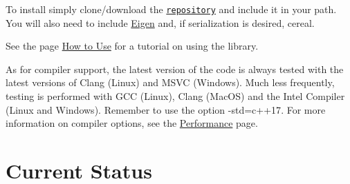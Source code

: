 \begin{DoxyItemize}
\item To install simply clone/download the \href{https://github.com/NickG-Math/Mackey}{\tt repository} and include it in your path. You will also need to include \hyperlink{namespaceEigen}{Eigen} and, if serialization is desired, cereal.
\item See the page \hyperlink{use}{How to Use} for a tutorial on using the library.
\item As for compiler support, the latest version of the code is always tested with the latest versions of Clang (Linux) and M\+S\+VC (Windows). Much less frequently, testing is performed with G\+CC (Linux), Clang (Mac\+OS) and the Intel Compiler (Linux and Windows). Remember to use the option {\ttfamily -\/std=c++17}. For more information on compiler options, see the \hyperlink{perf}{Performance} page.
\end{DoxyItemize}\hypertarget{index_status}{}\section{Current Status}\label{index_status}

